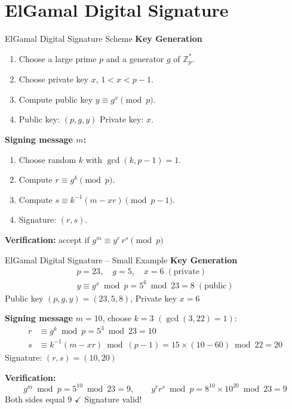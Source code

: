 \documentclass[aspectratio=169]{beamer}
\begin{document}
\section{ElGamal Digital Signature}
\begin{frame}{ElGamal Digital Signature Scheme}
  \textbf{Key Generation}
  \begin{enumerate}
    \item Choose a large prime $p$ and a generator $g$ of $\mathbb{Z}_p^{*}$.
    \item Choose private key $x$, $1 < x < p-1$.
    \item Compute public key $y \equiv g^{x} \pmod p$.
    \item Public key: $(p, g, y)$ \quad Private key: $x$.
  \end{enumerate}
  \textbf{Signing message $m$:}
  \begin{enumerate}
    \item Choose random $k$ with $\gcd(k, p-1) = 1$.
    \item Compute $r \equiv g^{k} \pmod p$.
    \item Compute $s \equiv k^{-1}(m - xr) \pmod{p-1}$.
    \item Signature: $(r,s)$.
  \end{enumerate}
  \textbf{Verification:} accept if \; $g^{m} \equiv y^{r}\, r^{s} \pmod p$
\end{frame}

\begin{frame}{ElGamal Digital Signature -- Small Example}
  \textbf{Key Generation}
  \begin{align*}
    p = 23, \quad g = 5, \quad x = 6 \;(\text{private})\\
    y \equiv g^{x} \bmod p = 5^{6} \bmod 23 = 8 \;(\text{public})
  \end{align*}
  Public key $(p,g,y) = (23,5,8)$, \quad Private key $x = 6$

  \textbf{Signing message} $m = 10$, choose $k = 3$ $(\gcd(3,22)=1)$:
  \begin{align*}
    r &\equiv g^{k} \bmod p = 5^{3} \bmod 23 = 10 \\
    s &\equiv k^{-1}(m - xr) \bmod (p-1) = 15 \times (10 - 60) \bmod 22 = 20
  \end{align*}
  Signature: $(r,s) = (10, 20)$

  \textbf{Verification:}
  \[
    g^{m} \bmod p = 5^{10} \bmod 23 = 9, \qquad
    y^{r} r^{s} \bmod p = 8^{10}\times 10^{20} \bmod 23 = 9
  \]
  Both sides equal $9$ \; $\checkmark$ \; Signature valid!
\end{frame}
\end{document}
